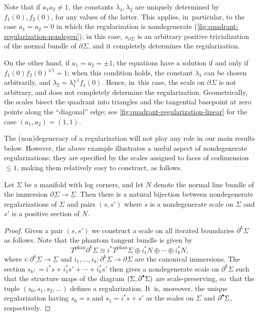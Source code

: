 \documentclass[JEP,XML,SOM,Unicode,NoFloatCountersInSection,published]{cedram}
\let\oldbullet\bullet
\renewcommand{\bullet}{{\raisebox{1pt}{$\scriptscriptstyle\oldbullet$}}}
\theoremstyle{definition}
\theoremstyle{remark}
\newenvironment{example}
  {\pushQED{\qed}\renewcommand{\qedsymbol}{$\lozenge$}\examplex}
  {\popQED\endexamplex}
\renewcommand{\le}{\leqslant}
\newcommand{\defas}{\mathrel{\mathop:}=}
\newcommand{\Sig}{\Sigma}
\newcommand{\uSig}{\underline{\Sigma}}
\newcommand{\phant}{\mathrm{phan}}
\newcommand{\ubdSig}[1][]{\underline{\partial^{#1}\Sigma}}
\newcommand{\bdSig}[1][]{\partial^{#1}\Sigma}
\newcommand{\tbphan}[2][]{T_{#1}^{\phant}#2}
\begin{document}
\begin{example}
Note that if $a_1a_2\neq 1$, the constants $\lambda_1,\lambda_2$ are uniquely determined by $f_1(0),f_2(0)$, for any values of the latter. This applies, in~particular, to the case $a_1=a_2=0$ in which the regularization is nondegenerate (\autoref{fig:quadrant-regularization-nondegen}); in this case, $s_{\bdSig}$ is an arbitrary positive trivialization of the normal bundle of $\ubdSig$, and it completely determines the regularization.

On the other hand, if $a_1=a_2 = \pm 1$, the equations have a solution if and only if $f_1(0)f_2(0)^{\pm 1}=1$; when this condition holds, the constant $\lambda_1$ can be chosen arbitrarily, and $\lambda_2 = \lambda_1^{\pm 1}f_1(0)$. Hence, in~this case, the scale on $\bdSig$ is not arbitrary, and does not completely determine the regularization. Geometrically, the scales bisect the quadrant into triangles and the tangential basepoint at zero points along the ``diagonal'' edge; see \autoref{fig:quadrant-regularization-linear} for the case $(a_1,a_2)=(1,1)$.
\end{example}

The (non)degeneracy of a regularization will not play any role in our main results below. However, the above example illustrates a useful aspect of nondegenerate regularizations: they are specified by the scales assigned to faces of codimension $\le 1$, making them relatively easy to construct, as follows.
\begin{proposition}
Let $\Sig$ be a manifold with log corners, and let $N$ denote the normal line bundle of the immersion $\ubdSig \to \uSig$. Then there is a natural bijection between nondegenerate regularizations of $\Sig$ and pairs $(s,s')$ where $s$ is a nondegenerate scale on $\Sig$ and $s'$ is a positive section of $N$.
\end{proposition}

\begin{proof}
Given a pair $(s,s')$ we construct a scale on all iterated boundaries $\bdSig[k]$ as follows. Note that the phantom tangent bundle is given by
\[
\tbphan{\bdSig[k]} \cong i^* \tbphan{\Sig}\oplus i_1^* N \oplus \cdots \oplus i_k^* N,
\]
where $i \colon \ubdSig[k] \to \uSig$ and $i_1,\ldots,i_k \colon \ubdSig[k] \to \ubdSig$ are the canonical immersions. The section $s_k \defas i^* s + i_1^*s' + \cdots + i_k^* s'$ then gives a nondegenerate scale on $\bdSig[k]$ such that the structure maps of the diagram $(\Sig,\partial^\bullet\Sig)$ are scale-preserving, so~that the tuple
$(s_0,s_1,s_2,\ldots)$ defines a regularization. It~is, moreover, the unique regularization having $s_0 =s$ and $s_1 = i^*s + s'$ as the scales on $\Sig$ and $\partial^\bullet\Sig$, respectively.
\end{proof}
\end{document}
